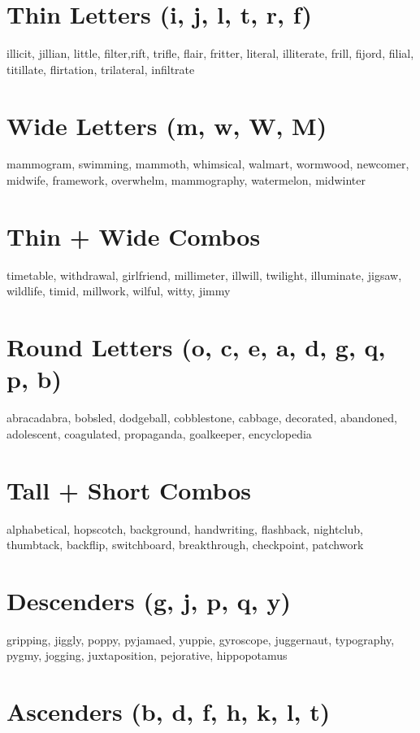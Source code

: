 \documentclass{article}
\begin{document}
\section*{Thin Letters (i, j, l, t, r, f)}

illicit, jillian, little, filter,rift, trifle, flair, fritter, literal, illiterate, frill, fijord, filial, titillate, flirtation, trilateral, infiltrate

\section*{Wide Letters (m, w, W, M)}

mammogram, swimming, mammoth, whimsical, walmart, wormwood, newcomer, midwife, framework, overwhelm, mammography, watermelon, midwinter

\section*{Thin + Wide Combos}

timetable, withdrawal, girlfriend, millimeter, illwill, twilight, illuminate, jigsaw, wildlife, timid, millwork, wilful, witty, jimmy

\section*{Round Letters (o, c, e, a, d, g, q, p, b)}

abracadabra, bobsled, dodgeball, cobblestone, cabbage, decorated, abandoned, adolescent, coagulated, propaganda, goalkeeper, encyclopedia

\section*{Tall + Short Combos}

alphabetical, hopscotch, background, handwriting, flashback, nightclub, thumbtack, backflip, switchboard, breakthrough, checkpoint, patchwork

\section*{Descenders (g, j, p, q, y)}

gripping, jiggly, poppy, pyjamaed, yuppie, gyroscope, juggernaut, typography, pygmy, jogging, juxtaposition, pejorative, hippopotamus

\section*{Ascenders (b, d, f, h, k, l, t)}
\end{document}
